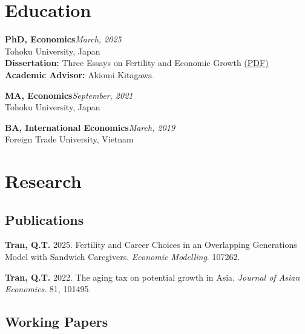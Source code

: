 \documentclass[12pt]{article}
\begin{document}

\section{Education}

\textbf{PhD, Economics}\hfill\emph{March, 2025}\\
Tohoku University, Japan \\
\textbf{Dissertation:} Three Essays on Fertility and Economic Growth \href{https://tohoku.repo.nii.ac.jp/record/2003894/files/250325-TRAN-221-1.pdf}{(PDF)}\\
\textbf{Academic Advisor:} Akiomi Kitagawa


\textbf{MA, Economics}\hfill\emph{September, 2021}\\
Tohoku University, Japan

\textbf{BA, International Economics}\hfill\emph{March, 2019}\\
Foreign Trade University, Vietnam


\section{Research}

\subsection{Publications}

\begin{enumerate}[label={[\arabic*]}]

\item \textbf{Tran, Q.T.} 2025. Fertility and Career Choices in an Overlapping Generations Model with Sandwich Caregivers. \textit{Economic Modelling}. 107262. 

\item \textbf{Tran, Q.T.} 2022. The aging tax on potential growth in Asia. \textit{Journal of Asian Economics}. 81, 101495. 
\end{enumerate}

\subsection{Working Papers}
\end{document}
